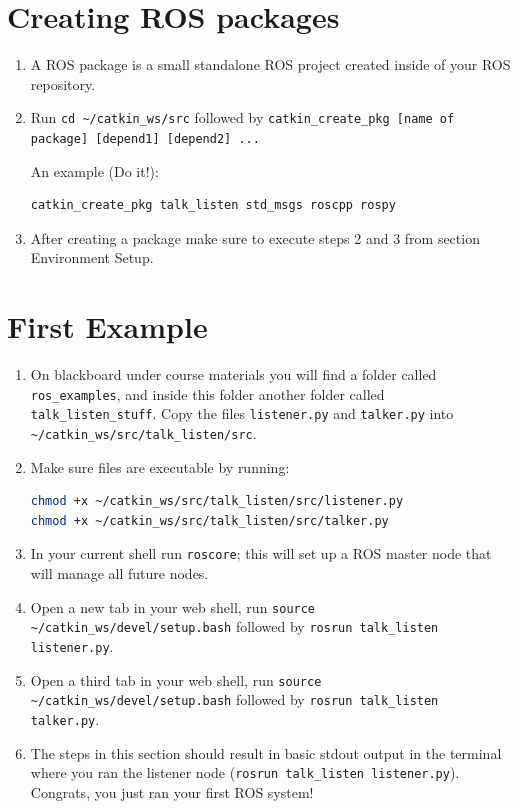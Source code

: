 \documentclass[11pt]{article}
\begin{document}
\section{Creating ROS packages}
\begin{enumerate}
\item A ROS package is a small standalone ROS project created inside of your ROS repository.
\item Run \texttt{cd \textasciitilde/catkin\_ws/src} followed by \texttt{catkin\_create\_pkg [name of package] [depend1] [depend2] ...}

An example (Do it!):
\begin{lstlisting}[language=bash,numbers=none]
catkin_create_pkg talk_listen std_msgs roscpp rospy
\end{lstlisting}
\item After creating a package make sure to execute steps 2 and 3 from section Environment Setup.
\end{enumerate}

\section{First Example}
\begin{enumerate}
\item On blackboard under course materials you will find a folder called \texttt{ros\_examples}, and inside this folder another folder called \texttt{talk\_listen\_stuff}. Copy the files \texttt{listener.py} and \texttt{talker.py} into \texttt{\textasciitilde/catkin\_ws/src/talk\_listen/src}.
\item Make sure files are executable by running:
\begin{lstlisting}[language=bash,numbers=none]
chmod +x ~/catkin_ws/src/talk_listen/src/listener.py
chmod +x ~/catkin_ws/src/talk_listen/src/talker.py
\end{lstlisting}
\item In your current shell run \texttt{roscore}; this will set up a ROS master node that will manage all future nodes.
\item Open a new tab in your web shell, run \texttt{source \textasciitilde/catkin\_ws/devel/setup.bash} followed by \texttt{rosrun talk\_listen listener.py}.
\item Open a third tab in your web shell, run \texttt{source \textasciitilde/catkin\_ws/devel/setup.bash} followed by \texttt{rosrun talk\_listen talker.py}.
\item The steps in this section should result in basic stdout output in the terminal where you ran the listener node (\texttt{rosrun talk\_listen listener.py}). Congrats, you just ran your first ROS system!
\end{enumerate}
\end{document}
